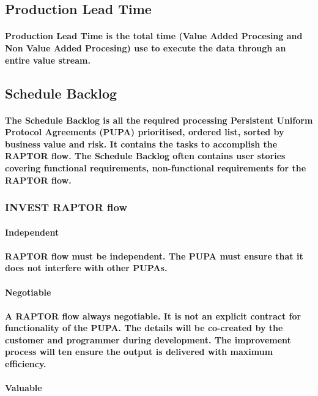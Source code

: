 \documentclass{acm_proc_article-sp}
\begin{document}
\subsection{Production Lead Time}
\paragraph{Production Lead Time is the total time (Value Added Procesing and Non Value Added Procesing) use to execute the data through an entire value stream.}
\subsection{Schedule Backlog}
\paragraph{The Schedule Backlog is all the required processing Persistent Uniform Protocol Agreements (PUPA) prioritised, ordered list, sorted by business value and risk. It contains the tasks to accomplish the RAPTOR flow. The Schedule Backlog often contains user stories covering functional requirements, non-functional requirements for the RAPTOR flow.}
\subsubsection{INVEST RAPTOR flow}
\paragraph{\textbf{Independent}}
\paragraph{RAPTOR flow must be independent. The PUPA must ensure that it does not interfere with other PUPAs.}
\paragraph{\textbf{Negotiable}}
\paragraph{A RAPTOR flow always negotiable. It is not an explicit contract for functionality of the PUPA. The details will be co-created by the customer and programmer during development. The improvement process will ten ensure the output is delivered with maximum efficiency.}
\paragraph{\textbf{Valuable}}
\end{document}
